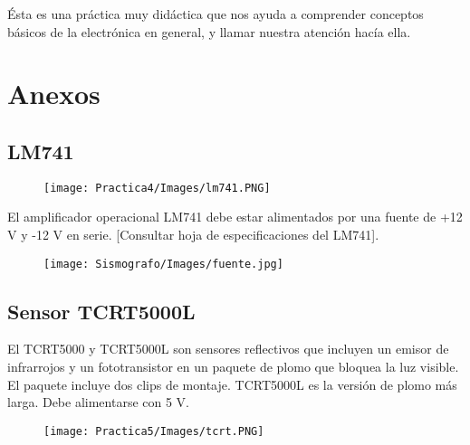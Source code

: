 \documentclass[12pt]{article}
\begin{document}
        Ésta es una práctica muy didáctica que nos ayuda a comprender conceptos básicos de la electrónica en general, y llamar nuestra atención hacía ella.
        
      
        \newpage
    
    \section{Anexos}
    \subsection{LM741}
	        \begin{figure}[h!]
                \centering
                \texttt{[image: Practica4/Images/lm741.PNG]}
            \end{figure} 
	        El amplificador operacional LM741 debe estar alimentados por una fuente de +12 V y -12 V en serie. [Consultar hoja de especificaciones del LM741].
	        
	        \begin{figure}[h!]
                \centering
                \texttt{[image: Sismografo/Images/fuente.jpg]}
            \end{figure} 
        \newpage
    \subsection{Sensor TCRT5000L}
    
    
    El TCRT5000 y TCRT5000L son sensores reflectivos que incluyen un emisor de infrarrojos y un fototransistor en un paquete de plomo que bloquea la luz visible. El paquete incluye dos clips de montaje. TCRT5000L es la versión de plomo más larga. Debe alimentarse con 5 V.
    
    \begin{figure}[h!]
                \centering
                \texttt{[image: Practica5/Images/tcrt.PNG]}
            \end{figure} 
    
       


    \nocite{ref1, ref2, ref3, ref4}
    
        

    
\end{document}
